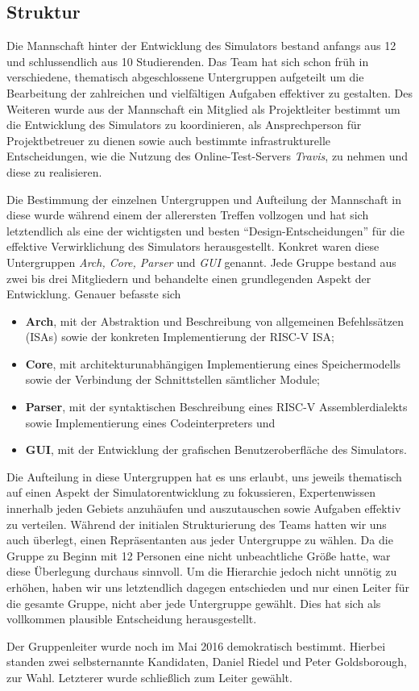 
\subsection{Struktur}
\label{team:orga-structure}

Die Mannschaft hinter der Entwicklung des \erasim{} Simulators bestand anfangs
aus 12 und schlussendlich aus 10 Studierenden. Das Team hat sich schon früh in
verschiedene, thematisch abgeschlossene Untergruppen aufgeteilt um die
Bearbeitung der zahlreichen und vielfältigen Aufgaben effektiver zu gestalten.
Des Weiteren wurde aus der Mannschaft ein Mitglied als Projektleiter bestimmt um
die Entwicklung des Simulators zu koordinieren, als Ansprechperson für
Projektbetreuer zu dienen sowie auch bestimmte infrastrukturelle Entscheidungen,
wie die Nutzung des Online-Test-Servers \emph{Travis}, zu nehmen und diese zu
realisieren.

Die Bestimmung der einzelnen Untergruppen und Aufteilung der Mannschaft in diese
wurde während einem der allerersten Treffen vollzogen und hat sich letztendlich
als eine der wichtigsten und besten ``Design-Entscheidungen'' für die effektive
Verwirklichung des Simulators herausgestellt. Konkret waren diese Untergruppen
\emph{Arch, Core, Parser} und \emph{GUI} genannt. Jede Gruppe bestand aus zwei
bis drei Mitgliedern und behandelte einen grundlegenden Aspekt der Entwicklung.
Genauer befasste sich

\begin{itemize}
  \item \textbf{Arch}, mit der Abstraktion und Beschreibung von allgemeinen Befehlssätzen (ISAs) sowie der konkreten Implementierung der RISC-V ISA;
  \item \textbf{Core}, mit architekturunabhängigen Implementierung eines Speichermodells sowie der Verbindung der Schnittstellen sämtlicher Module;
  \item \textbf{Parser}, mit der syntaktischen Beschreibung eines RISC-V Assemblerdialekts sowie Implementierung eines Codeinterpreters und
  \item \textbf{GUI}, mit der Entwicklung der grafischen Benutzeroberfläche des Simulators.
\end{itemize}

Die Aufteilung in diese Untergruppen hat es uns erlaubt, uns jeweils thematisch
auf einen Aspekt der Simulatorentwicklung zu fokussieren, Expertenwissen
innerhalb jeden Gebiets anzuhäufen und auszutauschen sowie Aufgaben effektiv zu
verteilen. Während der initialen Strukturierung des Teams hatten wir uns auch
überlegt, einen Repräsentanten aus jeder Untergruppe zu wählen. Da die Gruppe zu
Beginn mit 12 Personen eine nicht unbeachtliche Größe hatte, war diese
Überlegung durchaus sinnvoll. Um die Hierarchie jedoch nicht unnötig zu erhöhen,
haben wir uns letztendlich dagegen entschieden und nur einen Leiter für die
gesamte Gruppe, nicht aber jede Untergruppe gewählt. Dies hat sich als
vollkommen plausible Entscheidung herausgestellt.

Der Gruppenleiter wurde noch im Mai 2016 demokratisch bestimmt. Hierbei standen
zwei selbsternannte Kandidaten, Daniel Riedel und Peter Goldsborough, zur Wahl.
Letzterer wurde schließlich zum Leiter gewählt.
